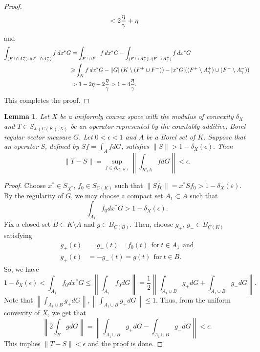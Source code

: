 \documentclass[a4paper]{amsart}
\theoremstyle{plain}
\newtheorem{lemma}[theorem]{Lemma}
\theoremstyle{definition}
\begin{document}
\begin{proof}
\begin{align*}
&<2{{\eta}\over{\gamma}}+\eta
\end{align*}
 and
\begin{align*}
\int_{(F^+\cap A^+_{\gamma})\cup(F^-\cap A^-_{\gamma})} f\, dx^*G &= \int_{F^+\cup F^-} f\, dx^*G - \int_{(F^+\setminus A^+_{\gamma})\cup(F^-\setminus A^-_{\gamma})} f\, dx^*G
\\
&{\geqslant} \int_{K} f\, dx^*G - \|G\|(K\setminus (F^+\cup F^-)) - |x^*G|((F^+\setminus A^+_{\gamma}) \cup (F^-\setminus A^-_{\gamma}))\\
&>1-2\eta-2{{\eta}\over{\gamma}}>1-4{{\eta}\over{\gamma}}.
\end{align*} This completes the proof.
\end{proof}

\begin{lemma}\label{uniform2}Let $X$ be a uniformly convex space with the modulus of convexity $\delta_X$ and $T\in S_{\mathcal{L}(C(K),X)}$ be an operator represented by the countably additive, Borel regular vector measure $G$.  Let $0<\epsilon<1$ and $A$ be a Borel set of $K$.  Suppose that an operator $S$, defined by $Sf=\int_A fdG$, satisfies $\|S\|>1-\delta_X(\epsilon).$ Then $$\|T-S\|=\sup_{f\in B_{C(K)}}\left\|\int_{K\setminus A}fdG\right\|<\epsilon.$$
\end{lemma}
\begin{proof}
Choose $x^*\in S_{X^*}$, $f_0\in S_{C(K)}$ such that $\|Sf_0\|=x^*Sf_0 > 1-\delta_X({\varepsilon})$.
By the regularity of $G$, we may choose a compact set $A_1\subset A$ such that $$\int_{A_1} f_0dx^*G >1-\delta_X(\epsilon).$$
Fix a closed set $B \subset{K\setminus A}$ and $g\in B_{C(B)}$. Then, choose $g_+$, $g_-\in B_{C(K)}$ satisfying
\begin{align*}
    g_+(t)&=g_-(t)=f_0(t)\ \ \text{for}\  t\in A_1 \ \ \text{and}\\
   g_+(t)&=- g_-(t)=g(t)\ \  \text{for}\ t\in B.
\end{align*}
So, we have
$$1-\delta_X(\epsilon)<\int_{A_1} f_0 dx^*G{\leqslant}\left\|\int_{A_1} f_0 dG\right\|=\frac 12\left\|{{\int_{A_1\cup B}g_+ dG+ \int_{A_1 \cup B}g_- dG}}\right\|.$$
Note that $\left\|\int_{A_1\cup B}g_+ dG\right\|,\left\|\int_{A_1\cup B}g_+ dG\right\|{\leqslant} 1$. Thus, from the uniform convexity of $X$, we get that $$\left\|2\int_{B}g dG\right\|=\left\|\int_{A_1 \cup B}g_+ dG-\int_{A_1 \cup B}g_- dG\right\|<\epsilon.$$
This implies $\|T-S\|<\epsilon$ and the proof is done.
\end{proof}
\end{document}
